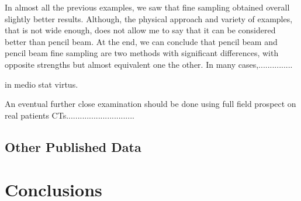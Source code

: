 \documentclass[12pt, a4paper, twoside]{book}
\begin{document}
In almost all the previous examples, we saw that fine sampling obtained overall slightly better results. Although, the physical approach and variety of examples, that is not wide enough, does not allow me to say that it can be considered better than pencil beam. 
At the end, we can conclude that pencil beam and pencil beam fine sampling are two methods with significant differences, with opposite strengths but almost equivalent one the other. In many cases,...............

in medio stat virtus.

An eventual further close examination should be done using full field prospect on real patients CTs.............................. 

\section{Other Published Data}

\chapter{Conclusions} %


\listoffigures
\listoftables
\end{document}
